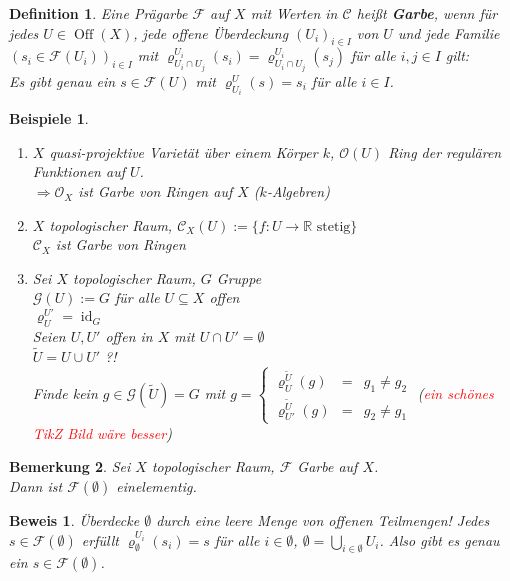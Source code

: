 \documentclass[a4paper,12pt]{report}
\theoremstyle{break}
\newtheorem{Def}{Definition}[section]
\newtheorem{Bem}[Def]{Bemerkung}
\theoremstyle{nonumberbreak}
\newtheorem{bspe}{Beispiele}
\newtheorem{bew}{Beweis}
\theoremstyle{nonumberplain}
\newcommand{\emp}[1]{\textbf{\emph{#1}}}
\newcommand{\defterm}[1]{{\index{#1}}\emp{#1}}
\DeclareMathOperator{\Off}{Off}
\DeclareMathOperator{\id}{id}
\newcommand{\R}{\mathbb{R}}
\begin{document}
\begin{Def}\label{1.3}
Eine Pr\"agarbe $\mathcal F$ auf $X$ mit Werten in $\mathcal C$ hei\ss t \defterm{Garbe}, wenn f\"ur jedes $U\in \Off(X)$, jede offene \"Uberdeckung $(U_i)_{i\in I}$ von $U$ und jede Familie $(s_i \in \mathcal F(U_i))_{i \in I}$ mit $\varrho_{U_i\cap U_j}^{U_i}(s_i) = \varrho_{U_i\cap U_j}^{U_i}(s_j)$ f\"ur alle $i,j \in I$ gilt:\\
Es gibt \emph{genau ein} $s \in \mathcal F(U)$ mit $\varrho_{U_i}^U(s) = s_i$ f\"ur alle $i \in I$.
\end{Def}

\begin{bspe}\label{bsp1.3}\begin{enumerate}[1)]
\item
	$X$ quasi-projektive Variet\"at \"uber einem K\"orper $k$, $\mathcal O(U)$ Ring der regul\"aren Funktionen auf $U$.\\
	$\Rightarrow \mathcal O_X$ ist Garbe von Ringen auf $X$ ($k$-Algebren)
\item
	$X$ topologischer Raum, $\mathcal C_X(U) := \{f: U\to \R \text{ stetig}\}$\\
	$\mathcal C_X$ ist Garbe von Ringen
\item\label{bsp1.3.3}
	Sei $X$ topologischer Raum, $G$ Gruppe\\
	$\mathcal G(U) := G$ f\"ur alle $U \subseteq X$ offen\\
	$\varrho_U^{U'} = \id_G$\\
	Seien $U, U'$ offen in $X$ mit $U\cap U' = \emptyset$\\
	$\widetilde U = U \cup U'$ ?!\\
	Finde kein $g\in \mathcal G(\widetilde U) = G$ mit $g = \left\{\begin{array}{rcl} \varrho_{U}^{\widetilde U}(g) &=& g_1 \ne g_2 \\ \varrho_{U'}^{\widetilde U}(g) &=& g_2 \ne g_1 \end{array}\right.$ (\textcolor{red}{ein sch\"ones TikZ Bild w\"are besser})
\end{enumerate}\end{bspe}

\begin{Bem}
Sei $X$ topologischer Raum, $\mathcal F$ Garbe auf $X$.\\
Dann ist $\mathcal F(\emptyset)$ einelementig.
\end{Bem}

\begin{bew}
\"Uberdecke $\emptyset$ durch eine leere Menge von offenen Teilmengen! Jedes $s\in\mathcal F(\emptyset)$ erf\"ullt $\varrho_{\emptyset}^{U_i}(s_i) = s$ f\"ur alle $i\in \emptyset$, $\emptyset = \bigcup\limits_{i\in \emptyset} U_i$. Also gibt es genau ein $s	\in\mathcal F(\emptyset)$.
\end{bew}
\end{document}
